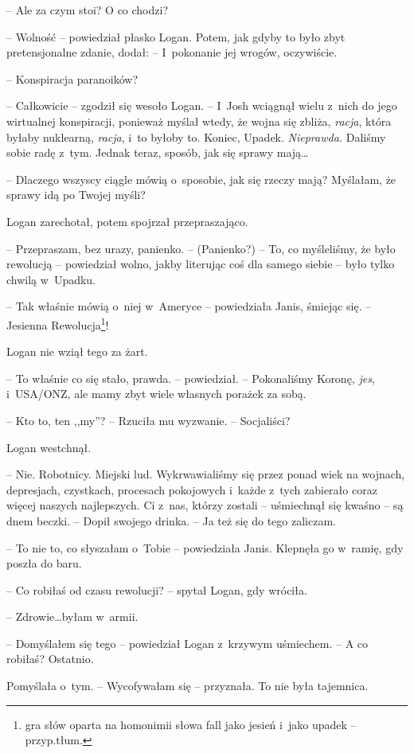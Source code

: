 \documentclass[oneside,polish,11pt,sfheadings]{mwbk}
\begin{document}
-- Ale za czym stoi? O co chodzi?

-- Wolność -- powiedział płasko Logan. Potem, jak gdyby to było zbyt
pretensjonalne zdanie, dodał: -- I~pokonanie jej wrogów, oczywiście.

-- Konspiracja paranoików?

-- Całkowicie -- zgodził się wesoło Logan. -- I~Josh wciągnął wielu z~nich
do jego wirtualnej konspiracji, ponieważ myślał wtedy, że wojna się
zbliża, \emph{racja}, która byłaby nuklearną, \emph{racja}, i~to byłoby
to. Koniec, Upadek. \emph{Nieprawda.} Daliśmy sobie radę z~tym. Jednak
teraz, sposób, jak się sprawy mają\ldots

-- Dlaczego wszyscy ciągle mówią o~sposobie, jak się rzeczy mają?
Myślałam, że sprawy idą po Twojej myśli?

Logan zarechotał, potem spojrzał przepraszająco. 

-- Przepraszam, bez
urazy, panienko. -- (Panienko?) -- To, co myśleliśmy, że było rewolucją -- powiedział wolno, jakby literując coś dla samego siebie -- było tylko
chwilą w~Upadku.

-- Tak właśnie mówią o~niej w~Ameryce -- powiedziała Janis, śmiejąc się. -- Jesienna Rewolucja\footnote{gra słów oparta na homonimii słowa fall jako jesień i~jako upadek -- przyp.tłum.}! 

Logan nie wziął tego za żart. 

-- To właśnie co się stało, prawda. -- powiedział. -- Pokonaliśmy Koronę, \emph{jes}, i~USA/ONZ, ale mamy zbyt
wiele własnych porażek za sobą.

-- Kto to, ten ,,my''? -- Rzuciła mu wyzwanie. -- Socjaliści?

Logan westchnął. 

-- Nie. Robotnicy. Miejski lud. Wykrwawialiśmy się przez
ponad wiek na wojnach, depresjach, czystkach, procesach pokojowych i~każde z~tych zabierało coraz więcej naszych najlepszych. Ci z~nas,
którzy zostali -- uśmiechnął się kwaśno -- są dnem beczki. -- Dopił swojego
drinka. -- Ja też się do tego zaliczam.

-- To nie to, co słyszałam o~Tobie -- powiedziała Janis. Klepnęła go w~ramię, gdy poszła do baru.

-- Co robiłaś od czasu rewolucji? -- spytał Logan, gdy wróciła.

-- Zdrowie\ldots byłam w~armii.

-- Domyślałem się tego -- powiedział Logan z~krzywym uśmiechem. -- A co
robiłaś? Ostatnio.

Pomyślała o~tym. -- Wycofywałam się -- przyznała. To nie była tajemnica.
\end{document}

